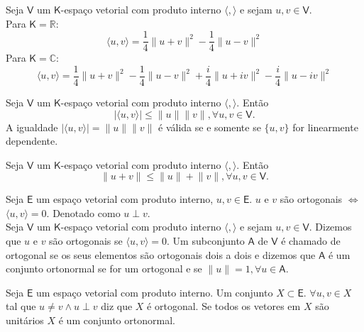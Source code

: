 \documentclass[10pt,a4paper]{article}
\begin{document}
\begin{proposition} 
	Seja $\mathsf{V}$ um $\mathsf{K}$-espaço vetorial com produto interno $\langle, \rangle$ e sejam $u, v \in \mathsf{V}$. \\
	Para $\mathsf{K} = \mathbb{R}$:
	\[
		\langle u, v \rangle = \frac{1}{4} \lVert u + v \rVert ^ 2 - \frac{1}{4} \lVert u - v \rVert ^ 2
	\] 
	Para $\mathsf{K} = \mathbb{C}$:
	\[
		\langle u, v \rangle = \frac{1}{4} \lVert u + v \rVert ^ 2 - \frac{1}{4} \lVert u - v \rVert ^ 2 +
		\frac{i}{4} \lVert u + iv \rVert ^ 2 - \frac{i}{4} \lVert u - iv \rVert ^ 2
	\] 
\end{proposition}

\begin{theorem} 
	Seja $\mathsf{V}$ um $\mathsf{K}$-espaço vetorial com produto interno $\langle, \rangle$. Então
\[
	|\langle u, v \rangle| \leq \lVert u \rVert \lVert v \rVert, \forall u, v\in \mathsf{V}.
\]
A igualdade $|\langle u, v \rangle| = \lVert u \rVert \lVert v \rVert$ é válida se e somente se $\{u, v\}$ for linearmente dependente.
\end{theorem}

\begin{corollary} 
	Seja $\mathsf{V}$ um $\mathsf{K}$-espaço vetorial com produto interno $\langle, \rangle$. Então
\[
	\lVert u +  v \rVert \leq \lVert u \rVert  + \lVert v \rVert, \forall u, v\in \mathsf{V}.
\]
\end{corollary}

\begin{definition}
	Seja $\textsf{E}$ um espaço vetorial com produto interno, $u, v \in \textsf{E}$. $u$ e $v$ são ortogonais $\Leftrightarrow$ $\langle u, v \rangle = 0$. Denotado como $u \perp v$.\\
	
	 Seja $\mathsf{V}$ um $\mathsf{K}$-espaço vetorial com produto interno $\langle, \rangle$ e sejam $u, v \in \mathsf{V}$. Dizemos que $u$ e $v$ são ortogonais se $\langle u, v \rangle = 0$. Um subconjunto $\mathsf{A}$ de $\mathsf{V}$ é chamado de ortogonal se os seus elementos são ortogonais dois a dois e dizemos que $\mathsf{A}$ é um conjunto ortonormal se for um ortogonal e se $\lVert u \rVert = 1, \forall u \in \mathsf{A}$.
\end{definition}

\begin{definition}
	Seja $\textsf{E}$ um espaço vetorial com produto interno. Um conjunto $X \subset \textsf{E}$. $\forall u, v \in X$ tal que $u \neq v \land u \perp v $ diz que $X$ é ortogonal. Se todos os vetores em $X$ são unitários $X$ é um conjunto ortonormal.
\end{definition}
\end{document}
